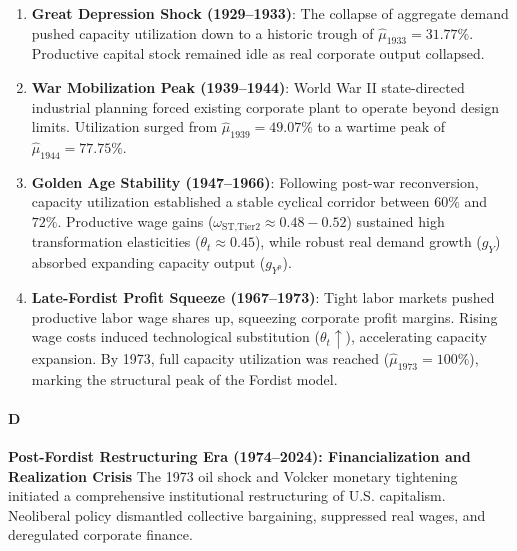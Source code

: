 \begin{enumerate}
	\item \textbf{Great Depression Shock (1929–1933)}: The collapse of aggregate demand pushed capacity utilization down to a historic trough of $\hat{\mu}_{1933} = 31.77\%$. Productive capital stock remained idle as real corporate output collapsed.
	\item \textbf{War Mobilization Peak (1939–1944)}: World War II state-directed industrial planning forced existing corporate plant to operate beyond design limits. Utilization surged from $\hat{\mu}_{1939} = 49.07\%$ to a wartime peak of $\hat{\mu}_{1944} = 77.75\%$.
	\item \textbf{Golden Age Stability (1947–1966)}: Following post-war reconversion, capacity utilization established a stable cyclical corridor between $60\%$ and $72\%$. Productive wage gains ($\omega_{\text{ST,Tier2}} \approx 0.48 - 0.52$) sustained high transformation elasticities ($\theta_t \approx 0.45$), while robust real demand growth ($g_Y$) absorbed expanding capacity output ($g_{Y^p}$).
	\item \textbf{Late-Fordist Profit Squeeze (1967–1973)}: Tight labor markets pushed productive labor wage shares up, squeezing corporate profit margins. Rising wage costs induced technological substitution ($\theta_t \uparrow$), accelerating capacity expansion. By 1973, full capacity utilization was reached ($\hat{\mu}_{1973} = 100\%$), marking the structural peak of the Fordist model.
\end{enumerate}

\paragraph{D}
\textbf{Post-Fordist Restructuring Era (1974–2024): Financialization and Realization Crisis}
The 1973 oil shock and Volcker monetary tightening initiated a comprehensive institutional restructuring of U.S. capitalism. Neoliberal policy dismantled collective bargaining, suppressed real wages, and deregulated corporate finance.


